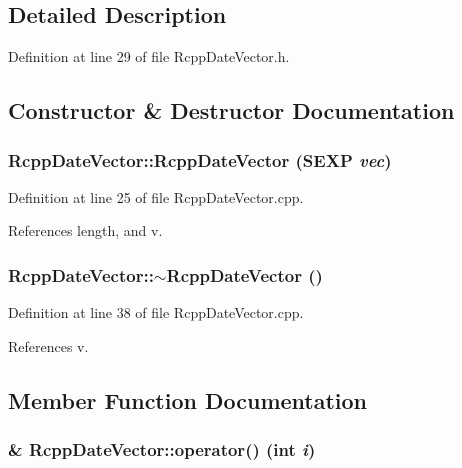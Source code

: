 \subsection{Detailed Description}


Definition at line 29 of file RcppDateVector.h.

\subsection{Constructor \& Destructor Documentation}
\hypertarget{classRcppDateVector_a65de4c0807f5c4b33429c8ebb5224831}{
\subsubsection[{RcppDateVector}]{\setlength{\rightskip}{0pt plus 5cm}RcppDateVector::RcppDateVector (SEXP {\em vec})}}
\label{classRcppDateVector_a65de4c0807f5c4b33429c8ebb5224831}


Definition at line 25 of file RcppDateVector.cpp.

References length, and v.\hypertarget{classRcppDateVector_aad0851f7555a09615ccb17bcb20fc7f1}{
\subsubsection[{$\sim$RcppDateVector}]{\setlength{\rightskip}{0pt plus 5cm}RcppDateVector::$\sim$RcppDateVector ()}}
\label{classRcppDateVector_aad0851f7555a09615ccb17bcb20fc7f1}


Definition at line 38 of file RcppDateVector.cpp.

References v.

\subsection{Member Function Documentation}
\hypertarget{classRcppDateVector_a42dad3d60fb136604f019353671195fe}{
\subsubsection[{operator()}]{ \& RcppDateVector::operator() (int {\em i})}}
\label{classRcppDateVector_a42dad3d60fb136604f019353671195fe}


